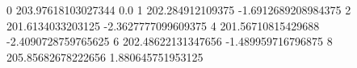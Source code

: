 0 203.97618103027344 0.0
1 202.284912109375 -1.6912689208984375
2 201.6134033203125 -2.3627777099609375
4 201.56710815429688 -2.4090728759765625
6 202.48622131347656 -1.489959716796875
8 205.85682678222656 1.880645751953125

